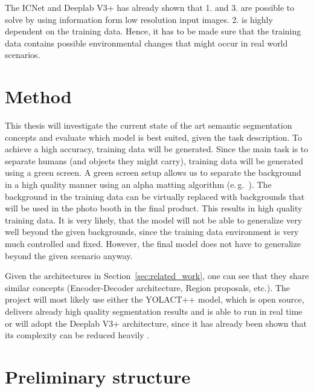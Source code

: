 \documentclass[11pt,
  paper=a4, 
  bibliography=totocnumbered,
	captions=tableheading,
	BCOR=10mm
]{scrreprt}
\theoremstyle{definition}
\newcommand{\eg}{e.\,g.~}
\begin{document}
The ICNet and Deeplab V3+ has already shown that 1. and 3. are possible to solve by using information form low resolution input images.
2. is highly dependent on the training data. 
Hence, it has to be made sure that the training data contains possible environmental changes that might occur in real world scenarios.

\chapter{Method}
\label{sec:Method}

This thesis will investigate the current state of the art semantic segmentation concepts and evaluate which model is best suited, given the task description.
To achieve a high accuracy, training data will be generated.
Since the main task is to separate humans (and objects they might carry), training data will be generated using a green screen.
A green screen setup allows us to separate the background in a high quality manner using an alpha matting algorithm (\eg \cite{Gastal2010}).
The background in the training data can be virtually replaced with backgrounds that will be used in the photo booth in the final product.
This results in high quality training data.
It is very likely, that the model will not be able to generalize very well beyond the given backgrounds, since the training data environment is very much controlled and fixed.
However, the final model does not have to generalize beyond the given scenario anyway. 

Given the architectures in Section~\ref{sec:related_work}, one can see that they share similar concepts (Encoder-Decoder architecture, Region proposals, etc.).
The project will most likely use either the YOLACT++ model, which is open source, delivers already high quality segmentation results and is able to run in real time or will adopt the Deeplab V3+ architecture, since it has already been shown that its complexity can be reduced heavily \cite{Bazarevsky2018}.

\chapter{Preliminary structure}
\end{document}
